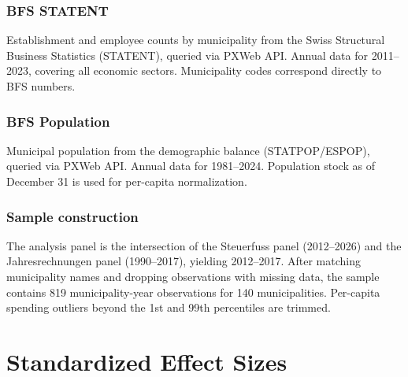 \documentclass[12pt]{article}
\begin{document}
\subsubsection*{BFS STATENT} Establishment and employee counts by municipality from the Swiss Structural Business Statistics (STATENT), queried via PXWeb API. Annual data for 2011--2023, covering all economic sectors. Municipality codes correspond directly to BFS numbers.

\subsubsection*{BFS Population} Municipal population from the demographic balance (STATPOP/ESPOP), queried via PXWeb API. Annual data for 1981--2024. Population stock as of December 31 is used for per-capita normalization.

\subsubsection*{Sample construction} The analysis panel is the intersection of the Steuerfuss panel (2012--2026) and the Jahresrechnungen panel (1990--2017), yielding 2012--2017. After matching municipality names and dropping observations with missing data, the sample contains 819 municipality-year observations for 140 municipalities. Per-capita spending outliers beyond the 1st and 99th percentiles are trimmed.

\section{Standardized Effect Sizes}
\label{sec:sde}


\end{document}
